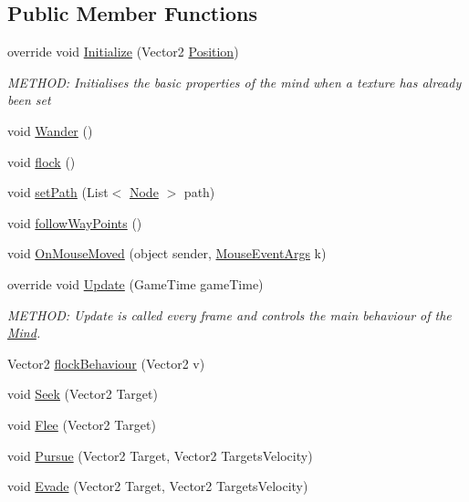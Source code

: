 \subsection*{Public Member Functions}
\begin{DoxyCompactItemize}
\item 
override void \hyperlink{a00346_a72922ee865087d504b1bca3fec35fb6e}{Initialize} (Vector2 \hyperlink{a00318_ad94b3975c0873fee06b5bd5a75bd38cd}{Position})
\begin{DoxyCompactList}\small\item\em M\+E\+T\+H\+OD\+: Initialises the basic properties of the mind when a texture has already been set \end{DoxyCompactList}\item 
void \hyperlink{a00346_a953d98dcd5ed2452a71e3658ecd5cf98}{Wander} ()
\item 
void \hyperlink{a00346_a232fba946737dac94731aff851985745}{flock} ()
\item 
void \hyperlink{a00346_a000c9f424dfdaedfb3ab00f8771ef859}{set\+Path} (List$<$ \hyperlink{a00414}{Node} $>$ path)
\item 
void \hyperlink{a00346_ab5caa6343f2e5d5d1854534ed919d018}{follow\+Way\+Points} ()
\item 
void \hyperlink{a00346_a593b91907bcd8d144942dd156ce7fc7e}{On\+Mouse\+Moved} (object sender, \hyperlink{a00374}{Mouse\+Event\+Args} k)
\item 
override void \hyperlink{a00346_a2e1f7ec281cfe2b7e8268a93bec59d4a}{Update} (Game\+Time game\+Time)
\begin{DoxyCompactList}\small\item\em M\+E\+T\+H\+OD\+: Update is called every frame and controls the main behaviour of the \hyperlink{a00318}{Mind}. \end{DoxyCompactList}\item 
Vector2 \hyperlink{a00346_a7c7017d89a91f07f479af5cc0ecc5eab}{flock\+Behaviour} (Vector2 v)
\item 
void \hyperlink{a00346_afb0d53f8cb93f437b89dbdc5ac0f71a2}{Seek} (Vector2 Target)
\item 
void \hyperlink{a00346_a882738a351da9a030468a018c69ee216}{Flee} (Vector2 Target)
\item 
void \hyperlink{a00346_a14fb4afcb6260502a8c545279ed6c8dc}{Pursue} (Vector2 Target, Vector2 Targets\+Velocity)
\item 
void \hyperlink{a00346_ac10a724f1df5a665fa88adbe97969d9c}{Evade} (Vector2 Target, Vector2 Targets\+Velocity)
\item 

\end{DoxyCompactItemize}
